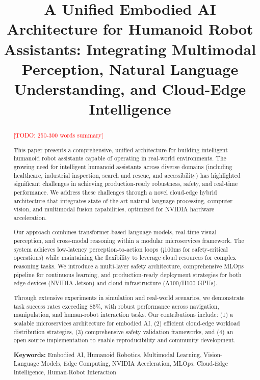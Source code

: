 \documentclass[conference]{IEEEtran}
\title{A Unified Embodied AI Architecture for Humanoid Robot Assistants: Integrating Multimodal Perception, Natural Language Understanding, and Cloud-Edge Intelligence}
\author{
\IEEEauthorblockN{Victor Ibhafidon}
\IEEEauthorblockA{\textit{Xtainless Technologies} \\
Email: info@xtainlesstech.com}
}
\newcommand{\todo}[1]{\textcolor{red}{[TODO: #1]}}
\begin{document}
\maketitle

\begin{abstract}
\todo{250-300 words summary}

This paper presents a comprehensive, unified architecture for building intelligent humanoid robot assistants capable of operating in real-world environments. The growing need for intelligent humanoid assistants across diverse domains (including healthcare, industrial inspection, search and rescue, and accessibility) has highlighted significant challenges in achieving production-ready robustness, safety, and real-time performance. We address these challenges through a novel cloud-edge hybrid architecture that integrates state-of-the-art natural language processing, computer vision, and multimodal fusion capabilities, optimized for NVIDIA hardware acceleration.

Our approach combines transformer-based language models, real-time visual perception, and cross-modal reasoning within a modular microservices framework. The system achieves low-latency perception-to-action loops (¡100ms for safety-critical operations) while maintaining the flexibility to leverage cloud resources for complex reasoning tasks. We introduce a multi-layer safety architecture, comprehensive MLOps pipeline for continuous learning, and production-ready deployment strategies for both edge devices (NVIDIA Jetson) and cloud infrastructure (A100/H100 GPUs).

Through extensive experiments in simulation and real-world scenarios, we demonstrate task success rates exceeding 85\%, with robust performance across navigation, manipulation, and human-robot interaction tasks. Our contributions include: (1) a scalable microservices architecture for embodied AI, (2) efficient cloud-edge workload distribution strategies, (3) comprehensive safety validation frameworks, and (4) an open-source implementation to enable reproducibility and community development.

\textbf{Keywords:} Embodied AI, Humanoid Robotics, Multimodal Learning, Vision-Language Models, Edge Computing, NVIDIA Acceleration, MLOps, Cloud-Edge Intelligence, Human-Robot Interaction
\end{abstract}
\end{document}
